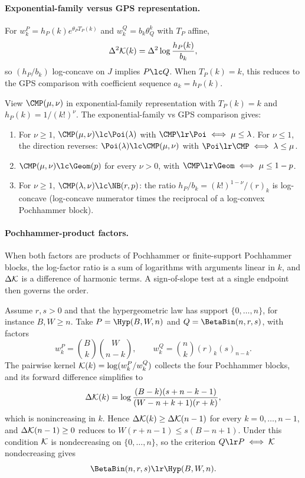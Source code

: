 \documentclass[11pt]{article}
\begin{document}
\paragraph{Exponential-family versus GPS representation.}
For \(w^P_k=h_P(k)e^{\theta_PT_P(k)}\) and \(w^Q_k=b_k\theta_Q^k\) with \(T_P\) affine,
\[
\Delta^2{\cal K}(k) =\Delta^2\log\frac{h_P(k)}{b_k},
\]
so \((h_P/b_k)\) log-concave on \(J\) implies \(P\lc Q\). When \(T_P(k)=k\), this reduces to the GPS comparison with coefficient sequence \(a_k=h_P(k)\).

\begin{example}
\label{ex:cmp-benchmarks}
View \(\CMP(\mu,\nu)\) in exponential-family representation with \(T_P(k)=k\) and \(h_P(k)=1/(k!)^\nu\). The exponential-family vs GPS comparison gives:
\begin{enumerate}[label=\textup{(\roman*)}]
\item For \(\nu\ge 1\), \(\CMP(\mu,\nu)\lc\Poi(\lambda)\) with \(\CMP\lr\Poi\iff\mu\le\lambda\). For \(\nu\le 1\), the direction reverses: \(\Poi(\lambda)\lc\CMP(\mu,\nu)\) with \(\Poi\lr\CMP\iff\lambda\le\mu\).
\item \(\CMP(\mu,\nu)\lc\Geom(p)\) for every \(\nu>0\), with \(\CMP\lr\Geom\iff\mu\le 1-p\).
\item For \(\nu\ge 1\), \(\CMP(\lambda,\nu)\lc\NB(r,p)\): the ratio \(h_P/b_k=(k!)^{1-\nu}/(r)_k\) is log-concave (log-concave numerator times the reciprocal of a log-convex Pochhammer block).
\end{enumerate}
\end{example}

\paragraph{Pochhammer-product factors.}
When both factors are products of Pochhammer or finite-support Pochhammer blocks, the log-factor ratio is a sum of logarithms with arguments linear in \(k\), and \(\Delta{\cal K}\) is a difference of harmonic terms. A sign-of-slope test at a single endpoint then governs the order.

\begin{example}
\label{ex:bb-hyp}
Assume \(r,s>0\) and that the hypergeometric law has support \(\{0,\dots,n\}\), for instance \(B,W\ge n\). Take \(P=\Hyp(B,W,n)\) and \(Q=\BetaBin(n,r,s)\), with factors
\[
w^P_k=\binom{B}{k}\binom{W}{n-k},
\qquad
w^Q_k=\binom{n}{k}(r)_k(s)_{n-k}.
\]
The pairwise kernel \({\cal K}(k)=\log(w^P_k/w^Q_k)\) collects the four Pochhammer blocks, and its forward difference simplifies to
\[
\Delta{\cal K}(k)
=\log\frac{(B-k)(s+n-k-1)}{(W-n+k+1)(r+k)},
\]
which is nonincreasing in \(k\). Hence \(\Delta{\cal K}(k)\ge \Delta{\cal K}(n-1)\) for every \(k=0,\dots,n-1\), and \(\Delta{\cal K}(n-1)\ge 0\) reduces to \(W(r+n-1)\le s(B-n+1)\). Under this condition \({\cal K}\) is nondecreasing on \(\{0,\dots,n\}\), so the criterion \(Q\lr P\iff{\cal K}\) nondecreasing gives
\[
\BetaBin(n,r,s)\lr\Hyp(B,W,n).
\]
\end{example}
\end{document}
